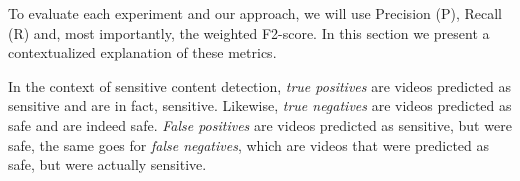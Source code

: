 To evaluate each experiment and our approach, we will use Precision (P), Recall (R) and, most importantly, the weighted F2-score. In this section we present a contextualized explanation of these metrics.




In the context of sensitive content detection, \textit{true positives} are videos predicted as sensitive and are in fact, sensitive. Likewise, \textit{true negatives} are videos predicted as safe and are indeed safe. \textit{False positives} are videos predicted as sensitive, but were safe, the same goes for \textit{false negatives}, which are videos that were predicted as safe, but were actually sensitive.

